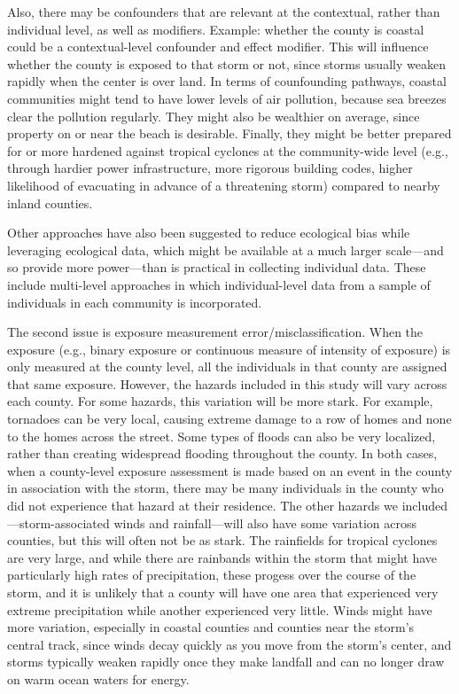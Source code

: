 Also, there may be confounders that are relevant at the contextual, rather than
individual level, as well as modifiers. Example: whether the county is coastal
could be a contextual-level confounder and effect modifier. This will influence
whether the county is exposed to that storm or not, since storms usually weaken
rapidly when the center is over land. In terms of counfounding pathways, coastal
communities might tend to have lower levels of air pollution, because sea
breezes clear the pollution regularly. They might also be wealthier on average,
since property on or near the beach is desirable. Finally, they might be better
prepared for or more hardened against tropical cyclones at the community-wide
level (e.g., through hardier power infrastructure, more rigorous building codes,
higher likelihood of evacuating in advance of a threatening storm) compared to
nearby inland counties. 

Other approaches have also been suggested to reduce ecological bias while
leveraging ecological data, which might be available at a much larger
scale---and so provide more power---than is practical in collecting individual
data. These include multi-level approaches in which individual-level data from a
sample of individuals in each community is incorporated.

The second issue is exposure measurement error/misclassification. When the
exposure (e.g., binary exposure or continuous measure of intensity of exposure)
is only measured at the county level, all the individuals in that county are
assigned that same exposure. However, the hazards included in this study will
vary across each county. For some hazards, this variation will be more stark.
For example, tornadoes can be very local, causing extreme damage to a row of
homes and none to the homes across the street. Some types of floods can also be
very localized, rather than creating widespread flooding throughout the county.
In both cases, when a county-level exposure assessment is made based on an event
in the county in association with the storm, there may be many individuals in
the county who did not experience that hazard at their residence. The other
hazards we included---storm-associated winds and rainfall---will also have some
variation across counties, but this will often not be as stark. The rainfields
for tropical cyclones are very large, and while there are rainbands within the
storm that might have particularly high rates of precipitation, these progess
over the course of the storm, and it is unlikely that a county will have one
area that experienced very extreme precipitation while another experienced very
little. Winds might have more variation, especially in coastal counties and
counties near the storm's central track, since winds decay quickly as you move
from the storm's center, and storms typically weaken rapidly once they make
landfall and can no longer draw on warm ocean waters for energy.

